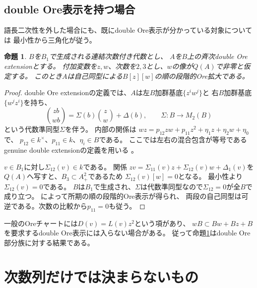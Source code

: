 \documentclass[11pt,a4paper]{ltjsarticle}
\newtheorem{proposition}[theorem]{命題}
\theoremstyle{definition}
\begin{document}
\subsection{double Ore表示を持つ場合}\label{subsec:double-ore}
語長二次性を外した場合にも、既にdouble Ore表示が分かっている対象については
最小性から三角化が従う。

\begin{proposition}\label{prop:double-triangular}
$B$を$B_1$で生成される連結次数付き代数とし、
$A$を$B$上の斉次double Ore extensionとする。
付加変数を$z,w$、次数を$2,3$とし、$w$の像が$Q(A)$で非零と仮定する。
このとき$A$は自己同型による$B[z][w]$の順の段階的Ore拡大である。
\end{proposition}

\begin{proof}
double Ore extensionの定義では、$A$は左$B$加群基底$\{z^iw^j\}$と
右$B$加群基底$\{w^jz^i\}$を持ち、
\[
\binom{zb}{wb}=
\Sigma(b)\binom zw+\Delta(b),\qquad
\Sigma:B\longrightarrow M_2(B)
\]
という代数準同型$\Sigma$を伴う。
内部の関係は
$wz=p_{12}zw+p_{11}z^2+\eta_1z+\eta_2w+\eta_0$で、
$p_{12}\in k^\times$、$p_{11}\in k$、$\eta_i\in B$である。
ここでは左右の混合包含が等号であるgenuine double extensionの定義を用いる
\cite[Definition 1.1]{CLM}。

$v\in B_1$に対し$\Sigma_{12}(v)\in k$である。
関係
$zv=\Sigma_{11}(v)z+\Sigma_{12}(v)w+\Delta_1(v)$を
$Q(A)$へ写すと、$B_3\subset A_+^2$であるため
$\Sigma_{12}(v)[w]=0$となる。
最小性より$\Sigma_{12}(v)=0$である。
$B$は$B_1$で生成され、$\Sigma$は代数準同型なので$\Sigma_{12}=0$が全$B$で成り立つ。
\cite[Theorem 2.2(a),(b)]{CLM}によって所期の順の段階的Ore表示が得られ、
両段の自己同型は可逆である。次数の比較から$p_{11}=0$も従う。
\end{proof}

一般のOreチャートには$D(v)=L(v)z^2$という項があり、
$wB\subset Bw+Bz+B$を要求するdouble Ore表示には入らない場合がある。
従って命題\ref{prop:double-triangular}はdouble Ore部分族に対する結果である。

\section{次数列だけでは決まらないもの}\label{sec:examples}
\end{document}
